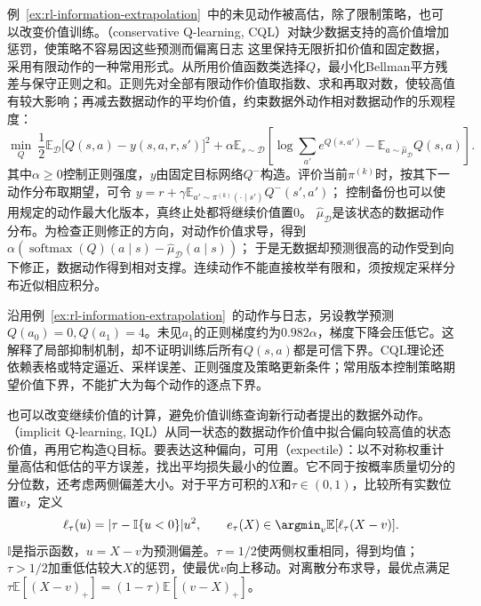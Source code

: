 例~\ref{ex:rl-information-extrapolation}~中的未见动作被高估，除了限制策略，也可以改变价值训练。（conservative Q-learning, CQL）对缺少数据支持的高价值增加惩罚，使策略不容易因这些预测而偏离日志
这里保持无限折扣价值和固定数据，采用有限动作的一种常用形式。从所用价值函数类选择$Q$，最小化Bellman平方残差与保守正则之和。正则先对全部有限动作价值取指数、求和再取对数，使较高值有较大影响；再减去数据动作的平均价值，约束数据外动作相对数据动作的乐观程度：
\begin{equation}
  \label{eq:rl-information-cql}
  \min_Q\
  \frac12\mathbb E_{\mathcal D}\bigl[Q(s,a)-y(s,a,r,s')\bigr]^2
  +\alpha\mathbb E_{s\sim\mathcal D}
       \left[\log\sum_{a'}e^{Q(s,a')}
                       -\mathbb E_{a\sim\widehat\mu_{\mathcal D}}Q(s,a)\right].
\end{equation}
其中$\alpha\geq0$控制正则强度，$y$由固定目标网络$Q^-$构造。评价当前$\pi^{(k)}$时，按其下一动作分布取期望，可令
$y=r+\gamma\mathbb E_{a'\sim\pi^{(k)}(\cdot\mid s')}Q^-(s',a')$；
控制备份也可以使用规定的动作最大化版本，真终止处都将继续价值置0。
$\widehat\mu_{\mathcal D}$是该状态的数据动作分布。为检查正则修正的方向，对动作价值求导，得到
$\alpha(\operatorname{softmax}(Q)(a\mid s)-\widehat\mu_{\mathcal D}(a\mid s))$；
于是无数据却预测很高的动作受到向下修正，数据动作得到相对支撑。连续动作不能直接枚举有限和，须按规定采样分布近似相应积分。

沿用例~\ref{ex:rl-information-extrapolation}~的动作与日志，另设教学预测
$Q(a_0)=0,Q(a_1)=4$。未见$a_1$的正则梯度约为$0.982\alpha$，梯度下降会压低它。这解释了局部抑制机制，却不证明训练后所有$Q(s,a)$都是可信下界。CQL理论还依赖表格或特定逼近、采样误差、正则强度及策略更新条件；常用版本控制策略期望价值下界，不能扩大为每个动作的逐点下界。

也可以改变继续价值的计算，避免价值训练查询新行动者提出的数据外动作。（implicit Q-learning, IQL）从同一状态的数据动作价值中拟合偏向较高值的状态价值，再用它构造Q目标。要表达这种偏向，可用（expectile）：以不对称权重计量高估和低估的平方误差，找出平均损失最小的位置。它不同于按概率质量切分的分位数，还考虑两侧偏差大小。对于平方可积的$X$和$\tau\in(0,1)$，比较所有实数位置$v$，定义
\begin{equation}
  \label{eq:rl-information-expectile}
  \ell_\tau(u)=|\tau-\mathbb I\{u<0\}|u^2,\qquad
  e_\tau(X)\in\argmin_v\mathbb E[\ell_\tau(X-v)].
\end{equation}
$\mathbb I$是指示函数，$u=X-v$为预测偏差。$\tau=1/2$使两侧权重相同，得到均值；$\tau>1/2$加重低估较大$X$的惩罚，使最优$v$向上移动。对离散分布求导，最优点满足
$\tau\mathbb E[(X-v)_+]=(1-\tau)\mathbb E[(v-X)_+]$。

